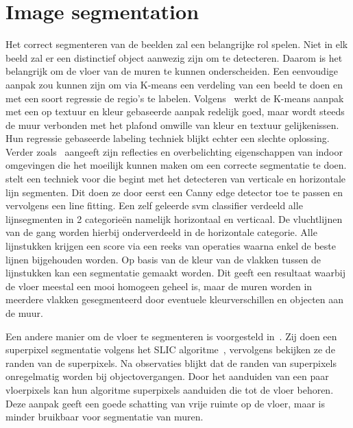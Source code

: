     \section{Image segmentation}\label{sec:image_segmentation}
        Het correct segmenteren van de beelden zal een belangrijke rol spelen. Niet in elk beeld zal er een distinctief object aanwezig zijn om te detecteren. Daarom is het belangrijk om de vloer van
        de muren te kunnen onderscheiden. Een eenvoudige aanpak zou kunnen zijn om via K-means een verdeling van een beeld te doen en met een soort regressie de regio's te labelen. 
        Volgens~\cite{zhangwall} werkt de K-means aanpak met een op textuur en kleur gebaseerde aanpak redelijk goed, maar wordt steeds de muur verbonden met het plafond omwille van kleur en textuur gelijkenissen.
        Hun regressie gebaseerde labeling techniek blijkt echter een slechte oplossing. Verder zoals~\cite{Li2010} aangeeft zijn reflecties en overbelichting eigenschappen van indoor omgevingen die het moeilijk kunnen maken om
        een correcte segmentatie te doen.
        \cite{Li2010} stelt een techniek voor die begint met het detecteren van verticale en horizontale lijn segmenten. Dit doen ze door eerst een Canny edge detector\cite{Canny} toe te passen en vervolgens een line fitting.
        Een zelf geleerde \gls{svm} classifier verdeeld alle lijnsegmenten in 2 categorie\"{e}n namelijk horizontaal en verticaal. De vluchtlijnen van de gang worden hierbij onderverdeeld in de horizontale categorie.
        Alle lijnstukken krijgen een score via een reeks van operaties waarna enkel de beste lijnen bijgehouden worden. Op basis van de kleur van de vlakken tussen de lijnstukken kan een segmentatie gemaakt worden.
        Dit geeft een resultaat waarbij de vloer meestal een mooi homogeen geheel is, maar de muren worden in meerdere vlakken gesegmenteerd door eventuele kleurverschillen en objecten aan de muur.
        
        Een andere manier om de vloer te segmenteren is voorgesteld in~\cite{Rodriguez-Telles2013}. Zij doen een superpixel segmentatie volgens het SLIC algoritme~\cite{slic}, vervolgens bekijken ze de randen van de superpixels.
        Na observaties blijkt dat de randen van superpixels onregelmatig worden bij objectovergangen. Door het aanduiden van een paar vloerpixels kan hun algoritme superpixels aanduiden die tot de vloer behoren.
        Deze aanpak geeft een goede schatting van vrije ruimte op de vloer, maar is minder bruikbaar voor segmentatie van muren.


